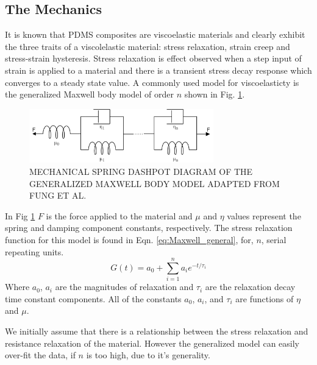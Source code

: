 \subsection*{The Mechanics}
It is known that PDMS composites are viscoelastic materials and clearly exhibit the three traits of a viscolelastic material\cite{Fung1993}: stress relaxation, strain creep and stress-strain hysteresis. Stress relaxation is effect observed when a step input of strain is applied to a material and there is a transient stress decay response which converges to a steady state value. A commonly used model for viscoelasticty is the generalized Maxwell body model of order $n$ shown in Fig. \ref{fig:Maxwell_general}.
\begin{figure}[H]
    \centering
    \includegraphics[width=8cm]{Figures/Generlised_Maxwell_body.png}
    \caption{MECHANICAL SPRING DASHPOT DIAGRAM OF THE GENERALIZED MAXWELL BODY MODEL ADAPTED FROM FUNG ET AL.\cite{Fung1993}}
    \label{fig:Maxwell_general}
\end{figure}
In Fig \ref{fig:Maxwell_general} $F$ is the force applied to the material and $\mu$ and $\eta$ values represent the spring and damping component constants, respectively. The stress relaxation function for this model is found in Eqn. \ref{eq:Maxwell_general}, for, $n$, serial repeating units. 
\begin{equation}
    G(t) = a_0 + \sum^n_{i=1} a_i e^{-t/\tau_i}
    \label{eq:Maxwell_general} 
\end{equation}
Where $a_0$, $a_i$ are the magnitudes of relaxation and $\tau_i$ are the relaxation decay time constant components. All of the constants $a_0$, $a_i$, and $\tau_i$ are functions of $\eta$ and $\mu$. 



We initially assume that there is a relationship between the stress relaxation and resistance relaxation of the material. However the generalized model can easily over-fit the data, if $n$ is too high, due to it's generality.



